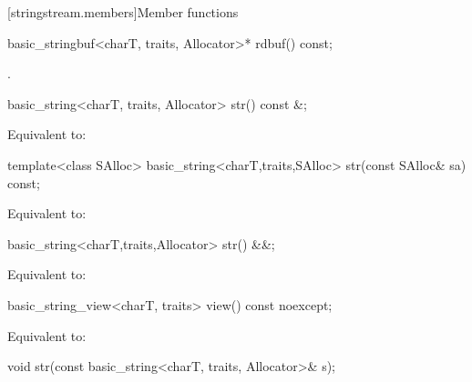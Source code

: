[stringstream.members]{Member functions}

%
\begin{itemdecl}
basic_stringbuf<charT, traits, Allocator>* rdbuf() const;
\end{itemdecl}

\begin{itemdescr}
\pnum
\returns
{}.
\end{itemdescr}

%
\begin{itemdecl}
basic_string<charT, traits, Allocator> str() const &;
\end{itemdecl}

\begin{itemdescr}
\pnum
\effects
Equivalent to: 
\end{itemdescr}

%
\begin{itemdecl}
template<class SAlloc>
  basic_string<charT,traits,SAlloc> str(const SAlloc& sa) const;
\end{itemdecl}

\begin{itemdescr}
\pnum
\effects
Equivalent to: 
\end{itemdescr}

%
\begin{itemdecl}
basic_string<charT,traits,Allocator> str() &&;
\end{itemdecl}

\begin{itemdescr}
\pnum
\effects
Equivalent to: 
\end{itemdescr}

%
\begin{itemdecl}
basic_string_view<charT, traits> view() const noexcept;
\end{itemdecl}

\begin{itemdescr}
\pnum
\effects
Equivalent to: 
\end{itemdescr}

%
\begin{itemdecl}
void str(const basic_string<charT, traits, Allocator>& s);
\end{itemdecl}

